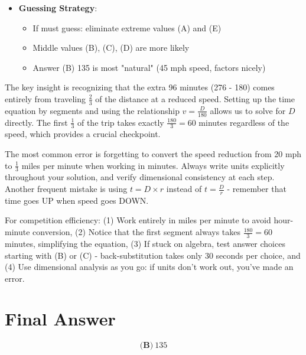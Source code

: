 \documentclass[11pt]{article}
\begin{document}
\begin{competitionbox}
\begin{itemize}[leftmargin=*]
    \item \textbf{Guessing Strategy}: 
    \begin{itemize}[leftmargin=*]
        \item If must guess: eliminate extreme values (A) and (E)
        \item Middle values (B), (C), (D) are more likely
        \item Answer (B) 135 is most "natural" (45 mph speed, factors nicely)
    \end{itemize}
\end{itemize}
\end{competitionbox}

\begin{keyinsightbox}
The key insight is recognizing that the extra 96 minutes (276 - 180) comes entirely from traveling $\frac{2}{3}$ of the distance at a reduced speed. Setting up the time equation by segments and using the relationship $v = \frac{D}{180}$ allows us to solve for $D$ directly. The first $\frac{1}{3}$ of the trip takes exactly $\frac{180}{3} = 60$ minutes regardless of the speed, which provides a crucial checkpoint.
\end{keyinsightbox}

\begin{warningbox}
The most common error is forgetting to convert the speed reduction from 20 mph to $\frac{1}{3}$ miles per minute when working in minutes. Always write units explicitly throughout your solution, and verify dimensional consistency at each step. Another frequent mistake is using $t = D \times r$ instead of $t = \frac{D}{r}$ - remember that time goes UP when speed goes DOWN.
\end{warningbox}

\begin{tipbox}
For competition efficiency: (1) Work entirely in miles per minute to avoid hour-minute conversion, (2) Notice that the first segment always takes $\frac{180}{3} = 60$ minutes, simplifying the equation, (3) If stuck on algebra, test answer choices starting with (B) or (C) - back-substitution takes only 30 seconds per choice, and (4) Use dimensional analysis as you go: if units don't work out, you've made an error.
\end{tipbox}

\section*{Final Answer}
\[\boxed{\textbf{(B)}\ 135}\]
\end{document}
